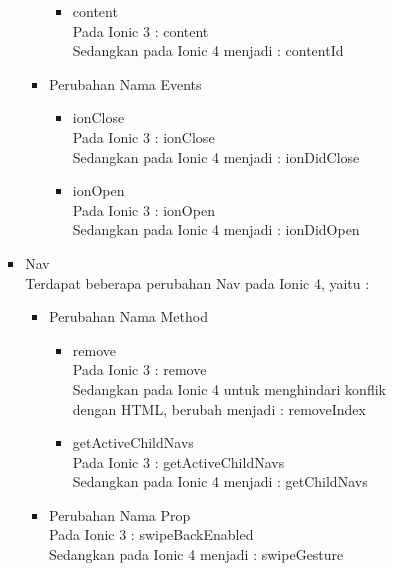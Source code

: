 \begin{enumerate}
\begin{enumerate}
\begin{itemize}
\begin{itemize}
\begin{itemize}
\begin{itemize}
							\item content \\
							Pada Ionic 3 : content \\
							Sedangkan pada Ionic 4 menjadi : contentId
						\end{itemize}	
					

					\item Perubahan Nama Events
						\begin{itemize}
							\item ionClose \\
							Pada Ionic 3 : ionClose \\
							Sedangkan pada Ionic 4 menjadi : ionDidClose

							\item ionOpen \\
							Pada Ionic 3 : ionOpen \\
							Sedangkan pada Ionic 4 menjadi : ionDidOpen
						\end{itemize}	
				\end{itemize}

\newpage

				\item Nav \\
				Terdapat beberapa perubahan Nav pada Ionic 4, yaitu :
				\begin{itemize}
					\item Perubahan Nama Method 
					\begin{itemize}
						\item remove \\
						Pada Ionic 3 : remove \\
						Sedangkan pada Ionic 4 untuk menghindari konflik dengan HTML, berubah menjadi : removeIndex 

						\item getActiveChildNavs \\
						Pada Ionic 3 : getActiveChildNavs \\
						Sedangkan pada Ionic 4 menjadi : getChildNavs
					\end{itemize}

					\item Perubahan Nama Prop \\
					Pada Ionic 3 : swipeBackEnabled   \\
					Sedangkan pada Ionic 4 menjadi : swipeGesture
				\end{itemize}	


\end{itemize}
\end{itemize}
\end{enumerate}
\end{enumerate}
